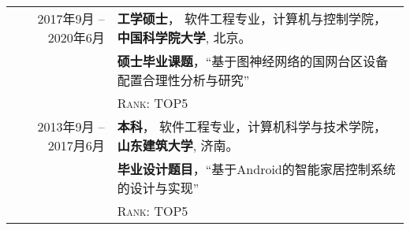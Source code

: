 %
%



\begin{tabular}{rl}
	\textsc{2017年9月 -- 2020年6月}	 & \textbf{工学硕士}， 软件工程专业，计算机与控制学院， \textbf{中国科学院大学}, 北京。\\

									& \textbf{硕士毕业课题}，``基于图神经网络的国网台区设备配置合理性分析与研究''\\

									& \textsc{Rank}: TOP5\\

	\textsc{2013年9月 --2017月6月} 	 &  \textbf{本科}， 软件工程专业，计算机科学与技术学院， \textbf{山东建筑大学}, 济南。\\
									&  \textbf{毕业设计题目}，``基于Android的智能家居控制系统的设计与实现''\\
									& \textsc{Rank}: TOP5 \\
\end{tabular}
